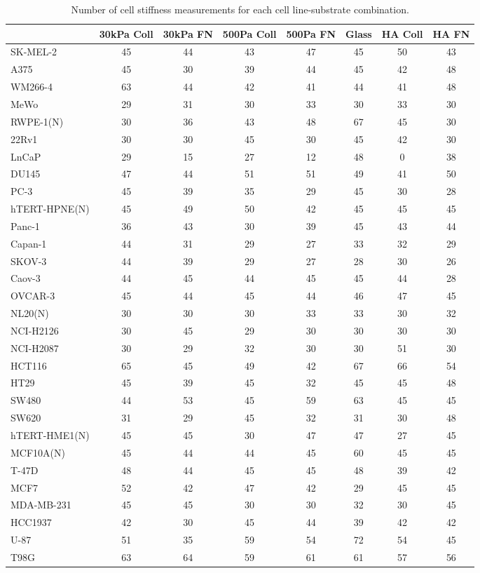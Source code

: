 \begin{table}[!h]
\centering
\caption{\label{tab:count-cell_stiffness}Number of cell stiffness measurements for each cell line-substrate combination.}
\centering
\begin{tabular}[t]{lccccccc}
\toprule
  & 30kPa Coll & 30kPa FN & 500Pa Coll & 500Pa FN & Glass & HA Coll & HA FN\\
\midrule
SK-MEL-2 & 45 & 44 & 43 & 47 & 45 & 50 & 43\\
A375 & 45 & 30 & 39 & 44 & 45 & 42 & 48\\
WM266-4 & 63 & 44 & 42 & 41 & 44 & 41 & 48\\
MeWo & 29 & 31 & 30 & 33 & 30 & 33 & 30\\
RWPE-1(N) & 30 & 36 & 43 & 48 & 67 & 45 & 30\\
22Rv1 & 30 & 30 & 45 & 30 & 45 & 42 & 30\\
LnCaP & 29 & 15 & 27 & 12 & 48 & 0 & 38\\
DU145 & 47 & 44 & 51 & 51 & 49 & 41 & 50\\
PC-3 & 45 & 39 & 35 & 29 & 45 & 30 & 28\\
hTERT-HPNE(N) & 45 & 49 & 50 & 42 & 45 & 45 & 45\\
Panc-1 & 36 & 43 & 30 & 39 & 45 & 43 & 44\\
Capan-1 & 44 & 31 & 29 & 27 & 33 & 32 & 29\\
SKOV-3 & 44 & 39 & 29 & 27 & 28 & 30 & 26\\
Caov-3 & 44 & 45 & 44 & 45 & 45 & 44 & 28\\
OVCAR-3 & 45 & 44 & 45 & 44 & 46 & 47 & 45\\
NL20(N) & 30 & 30 & 30 & 33 & 33 & 30 & 32\\
NCI-H2126 & 30 & 45 & 29 & 30 & 30 & 30 & 30\\
NCI-H2087 & 30 & 29 & 32 & 30 & 30 & 51 & 30\\
HCT116 & 65 & 45 & 49 & 42 & 67 & 66 & 54\\
HT29 & 45 & 39 & 45 & 32 & 45 & 45 & 48\\
SW480 & 44 & 53 & 45 & 59 & 63 & 45 & 45\\
SW620 & 31 & 29 & 45 & 32 & 31 & 30 & 48\\
hTERT-HME1(N) & 45 & 45 & 30 & 47 & 47 & 27 & 45\\
MCF10A(N) & 45 & 44 & 44 & 45 & 60 & 45 & 45\\
T-47D & 48 & 44 & 45 & 45 & 48 & 39 & 42\\
MCF7 & 52 & 42 & 47 & 42 & 29 & 45 & 45\\
MDA-MB-231 & 45 & 45 & 30 & 30 & 32 & 30 & 45\\
HCC1937 & 42 & 30 & 45 & 44 & 39 & 42 & 42\\
U-87 & 51 & 35 & 59 & 54 & 72 & 54 & 45\\
T98G & 63 & 64 & 59 & 61 & 61 & 57 & 56\\
\bottomrule
\end{tabular}
\end{table}
